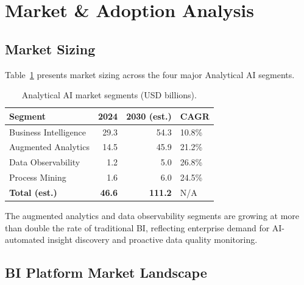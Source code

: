 \documentclass[12pt, a4paper]{article}
\begin{document}
\section{Market \& Adoption Analysis}\label{sec:market}

\subsection{Market Sizing}
Table~\ref{tab:market} presents market sizing across the four major Analytical AI segments.

\begin{table}[ht]
\centering
\caption{Analytical AI market segments (USD billions).}
\label{tab:market}
\begin{tabular}{lrrl}
\toprule
\textbf{Segment} & \textbf{2024} & \textbf{2030 (est.)} & \textbf{CAGR} \\
\midrule
Business Intelligence       & 29.3 & 54.3  & 10.8\% \\
Augmented Analytics         & 14.5 & 45.9  & 21.2\% \\
Data Observability          & 1.2  & 5.0   & 26.8\% \\
Process Mining              & 1.6  & 6.0   & 24.5\% \\
\midrule
\textbf{Total (est.)}      & \textbf{46.6} & \textbf{111.2} & N/A \\
\bottomrule
\end{tabular}
\end{table}

The augmented analytics and data observability segments are growing at more than double the rate of traditional BI, reflecting enterprise demand for AI-automated insight discovery and proactive data quality monitoring.

\subsection{BI Platform Market Landscape}
\end{document}
